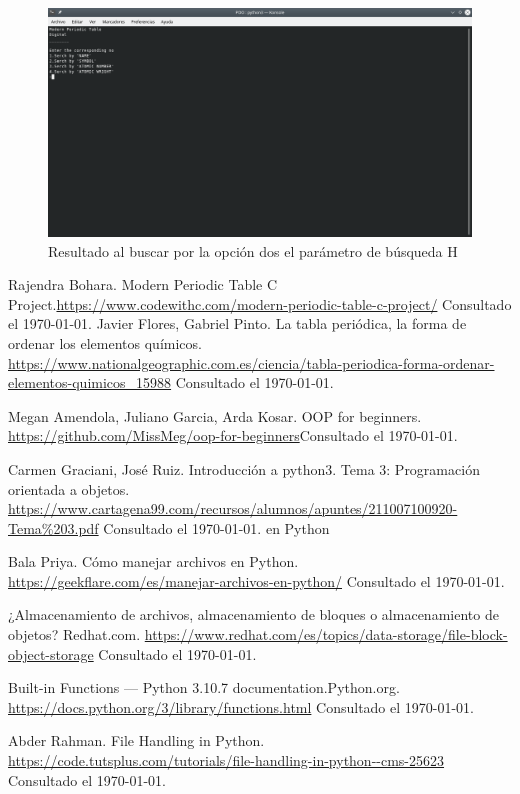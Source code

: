 \documentclass[conference]{IEEEtran}
\begin{document}
\begin{figure}[h!]
\includegraphics[width=1 \columnwidth]{cap_03.png}
\caption{Resultado al buscar por la opción dos el parámetro de búsqueda H}
\label{img:04}
\end{figure}

\newpage
\begin{thebibliography}{0}
	 Rajendra Bohara. Modern Periodic Table C Project.\url{https://www.codewithc.com/modern-periodic-table-c-project/} Consultado el \today.
	 Javier Flores, Gabriel Pinto. La tabla periódica, la forma de ordenar los elementos químicos. \url{https://www.nationalgeographic.com.es/ciencia/tabla-periodica-forma-ordenar-elementos-quimicos_15988} Consultado el \today.
	
	 Megan Amendola, Juliano Garcia, Arda Kosar. OOP for beginners. \url{https://github.com/MissMeg/oop-for-beginners}Consultado el \today.
	
	 Carmen Graciani, José Ruiz. Introducción a python3. Tema 3: Programación orientada a objetos. \url{https://www.cartagena99.com/recursos/alumnos/apuntes/211007100920-Tema\%203.pdf} Consultado el \today.
en Python 

	 Bala Priya. Cómo manejar archivos en Python. \url{https://geekflare.com/es/manejar-archivos-en-python/} Consultado el \today.
	 
	  ¿Almacenamiento de archivos, almacenamiento de bloques o almacenamiento de objetos? Redhat.com. \url{https://www.redhat.com/es/topics/data-storage/file-block-object-storage} Consultado el \today.

	 Built-in Functions — Python 3.10.7 documentation.Python.org. \url{https://docs.python.org/3/library/functions.html} Consultado el \today.

	 Abder Rahman. File Handling in Python. \url{https://code.tutsplus.com/tutorials/file-handling-in-python--cms-25623} Consultado el \today.

\end{thebibliography}
\end{document}
